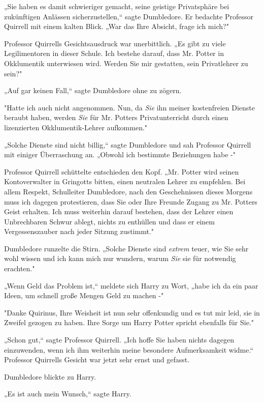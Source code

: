 {„Sie haben es damit schwieriger gemacht, seine geistige Privatsphäre bei zukünftigen Anlässen sicherzustellen,“ sagte Dumbledore. Er bedachte Professor Quirrell mit einem kalten Blick. „War das Ihre Absicht, frage ich mich?"

Professor Quirrells Gesichtsausdruck war unerbittlich. „Es gibt zu viele Legilimentoren in dieser Schule. Ich bestehe darauf, dass Mr. Potter in Okklumentik unterwiesen wird. Werden Sie mir gestatten, sein Privatlehrer zu sein?"

„Auf gar keinen Fall,“ sagte Dumbledore ohne zu zögern.

"Hatte ich auch nicht angenommen. Nun, da \emph{Sie} ihn meiner kostenfreien Dienste beraubt haben, werden \emph{Sie} für Mr. Potters Privatunterricht durch einen lizenzierten Okklumentik-Lehrer aufkommen."

„Solche Dienste sind nicht billig,“ sagte Dumbledore und sah Professor Quirrell mit einiger Überraschung an. „Obwohl ich bestimmte Beziehungen habe -"

Professor Quirrell schüttelte entschieden den Kopf. „Mr. Potter wird seinen Kontoverwalter in Gringotts bitten, einen neutralen Lehrer zu empfehlen. Bei allem Respekt, Schulleiter Dumbledore, nach den Geschehnissen dieses Morgens muss ich dagegen protestieren, dass Sie oder Ihre Freunde Zugang zu Mr. Potters Geist erhalten. Ich muss weiterhin darauf bestehen, dass der Lehrer einen Unbrechbaren Schwur ablegt, nichts zu enthüllen und dass er einem Vergessenszauber nach jeder Sitzung zustimmt."

Dumbledore runzelte die Stirn. „Solche Dienste sind \emph{extrem} teuer, wie Sie sehr wohl wissen und ich kann mich nur wundern, warum \emph{Sie} sie für notwendig erachten."

„Wenn Geld das Problem ist,“ meldete sich Harry zu Wort, „habe ich da ein paar Ideen, um schnell große Mengen Geld zu machen -"

"Danke Quirinus, Ihre Weisheit ist nun sehr offenkundig und es tut mir leid, sie in Zweifel gezogen zu haben. Ihre Sorge um Harry Potter spricht ebenfalls für Sie."

„Schon gut,“ sagte Professor Quirrell. „Ich hoffe Sie haben nichts dagegen einzuwenden, wenn ich ihm weiterhin meine besondere Aufmerksamkeit widme.“ Professor Quirrells Gesicht war jetzt sehr ernst und gefasst.

Dumbledore blickte zu Harry.

„Es ist auch mein Wunsch,“ sagte Harry.

}
